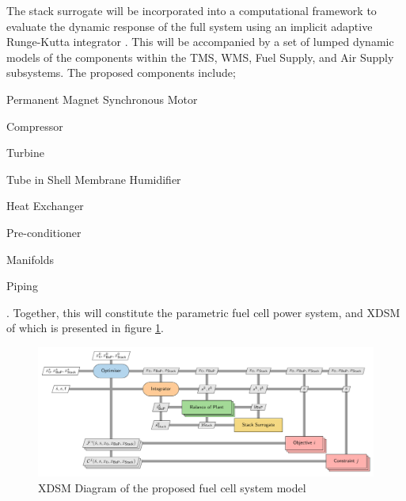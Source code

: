 The stack surrogate will be incorporated into a computational framework to evaluate the dynamic response of the full system using an implicit adaptive Runge-Kutta integrator \cite{SolvingOrdinaryDifferential}.
This will be accompanied by a set of lumped dynamic models of the components within the TMS, WMS, Fuel Supply, and Air Supply subsystems.
The proposed components include; \begin{enumerate*} 	\item Permanent Magnet Synchronous Motor
	\item Compressor
	\item Turbine
	\item Tube in Shell Membrane Humidifier
	\item Heat Exchanger
	\item Pre-conditioner
	\item Manifolds
	\item Piping
\end{enumerate*}. Together, this will constitute the parametric fuel cell power system, and XDSM of which is presented  in figure \ref{fig:xdsm}.
\begin{center}
	\begin{figure}
		\includegraphics[width=\linewidth]{figures/xdsm.pdf}
		\caption{XDSM Diagram of the proposed fuel cell system model}
		\label{fig:xdsm}
	\end{figure}
\end{center}

